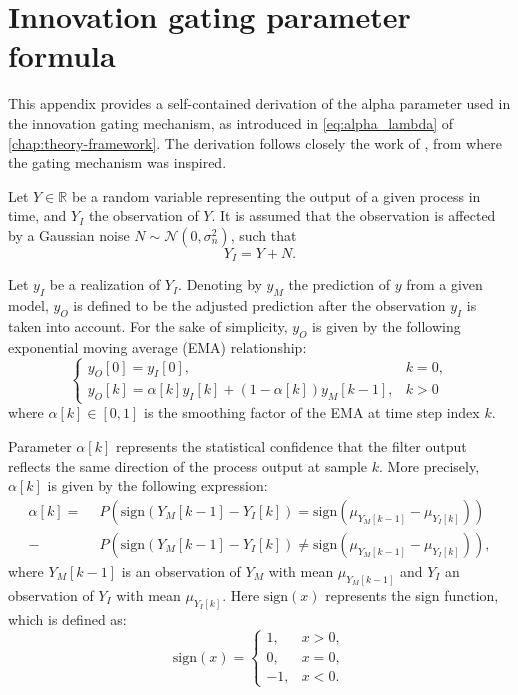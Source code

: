\chapter{Innovation gating parameter formula}
\label{chap:deriving-alpha}

This appendix provides a self-contained derivation of the alpha parameter 
used in the innovation gating mechanism, as introduced in \cref{eq:alpha_lambda} of \cref{chap:theory-framework}. 
The derivation follows closely the work of , from where the gating mechanism was inspired.

Let $Y \in \mathbb{R}$ be a random variable representing the output of a given process in time, and $Y_I$ the observation of $Y$.
It is assumed that the observation is affected by a Gaussian noise $N \sim \mathcal{N}(0, \sigma_n^2)$, such that
%
\begin{equation}
    Y_I = Y + N.
\end{equation}

Let $y_I$ be a realization of $Y_I$.
Denoting by $y_M$ the prediction of $y$ from a given model, 
$y_O$ is defined to be the adjusted prediction after the observation $y_I$ is taken into account.
For the sake of simplicity, $y_O$ is given by the following exponential moving average (EMA) relationship:
%
\begin{equation}
    \begin{cases}
        y_O[0] = y_I[0], & k = 0, \\
        y_O[k] = \alpha[k] y_I[k] + (1 - \alpha[k]) y_M[k-1], & k > 0
    \end{cases}
\end{equation}
%
where $\alpha[k] \in [0, 1]$ is the smoothing factor of the EMA at time step index $k$.

Parameter $\alpha[k]$ represents the statistical confidence that 
the filter output reflects the same direction of the process output at sample $k$. 
More precisely, $\alpha[k]$ is given by the following expression:
%
\begin{align}
    \alpha[k] = \ \
    &P(\mathrm{sign}(Y_M[k-1] - Y_I[k]) =    \mathrm{sign}(\mu_{Y_M[k-1]} - \mu_{Y_I[k]})) \nonumber\\ -
    &P(\mathrm{sign}(Y_M[k-1] - Y_I[k]) \neq \mathrm{sign}(\mu_{Y_M[k-1]} - \mu_{Y_I[k]})),
\label{eq:alpha}
\end{align}
%
where $Y_M[k-1]$ is an observation of $Y_M$ with mean $\mu_{Y_M[k-1]}$
and $Y_I$ an observation of $Y_I$ with mean $\mu_{Y_I[k]}$. 
Here $\mathrm{sign}(x)$ represents the sign function, which is defined as:
%
\begin{equation}
    \mathrm{sign}(x) =
    \begin{cases}
        1, & x > 0, \\
        0, & x = 0, \\
        -1, & x < 0.
    \end{cases}
\end{equation}

